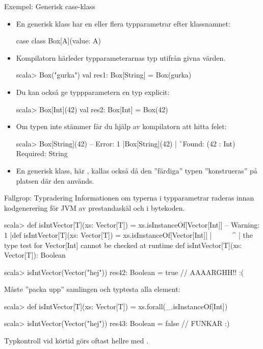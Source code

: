 \begin{Slide}{Exempel: Generisk case-klass}
\begin{itemize}\SlideFontTiny
\item En generisk klass har en eller flera typparametrar efter klassnamnet:
\begin{CodeSmall}
case class Box[A](value: A)  
\end{CodeSmall}
\item Kompilatorn härleder typparameterarnas typ utifrån givna värden. 
\begin{REPLsmall}
scala> Box("gurka")  
val res1: Box[String] = Box(gurka)
\end{REPLsmall}
\item Du kan också ge typpparametern en typ explicit:
\begin{REPLsmall}
scala> Box[Int](42) 
val res2: Box[Int] = Box(42)
\end{REPLsmall}
\item Om typen inte stämmer får du hjälp av kompilatorn att hitta felet:
\begin{REPLsmall}
scala> Box[String](42)
-- Error:
1 |Box[String](42)
  |            ^^ Found:    (42 : Int)  Required: String
\end{REPLsmall}
\item En generisk klass, här , kallas också   då den ''färdiga'' typen  ''konstrueras'' på platsen där den används.
\end{itemize}
\end{Slide}




\begin{Slide}{Fallgrop: Typradering }\SlideFontSmall
Informationen om typerna i typparametrar raderas innan kodgenerering för JVM av prestandaskäl och  i bytekoden.
\vspace{-0.25em}\begin{REPL}
scala> def isIntVector[T](xs: Vector[T]) = xs.isInstanceOf[Vector[Int]]
-- Warning:
1 |def isIntVector[T](xs: Vector[T]) = xs.isInstanceOf[Vector[Int]]
  |                                    ^^^^^^^^^^^^^^^^^^^^^^^^^^^^
  |                the type test for Vector[Int] cannot be checked at runtime
def isIntVector[T](xs: Vector[T]): Boolean

scala> isIntVector(Vector("hej"))
res42: Boolean = true  // AAAARGHH!! :(
\end{REPL}
Måste ''packa upp'' samlingen och typtesta alla element:
\begin{REPL}
scala> def isIntVector[T](xs: Vector[T]) = xs.forall(_.isInstanceOf[Int])

scala> isIntVector(Vector("hej"))
res43: Boolean = false  // FUNKAR :)

\end{REPL}
Typkontroll vid körtid görs oftast hellre med .

\end{Slide}

